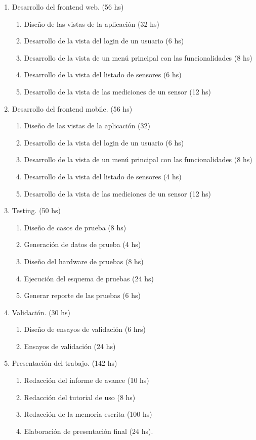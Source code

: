 \documentclass[
11pt, %
]{charter}
\begin{document}
\begin{enumerate}
\item Desarrollo del frontend web. (56 hs)
	\begin{enumerate}
	\item Diseño de las vistas de la aplicación (32 hs)
	\item Desarrollo de la vista del login de un usuario (6 hs)
	\item Desarrollo de la vista de un menú principal con las funcionalidades (8 hs)
	\item Desarrollo de la vista del listado de sensores (6 hs)
	\item Desarrollo de la vista de las mediciones de un sensor (12 hs)
	\end{enumerate}
\item Desarrollo del frontend mobile. (56 hs)
	\begin{enumerate}
	\item Diseño de las vistas de la aplicación (32)
	\item Desarrollo de la vista del login de un usuario (6 hs)
	\item Desarrollo de la vista de un menú principal con las funcionalidades (8 hs)
	\item Desarrollo de la vista del listado de sensores (4 hs)
	\item Desarrollo de la vista de las mediciones de un sensor (12 hs)
	\end{enumerate}
\item Testing. (50 hs)
	\begin{enumerate}
	\item Diseño de casos de prueba (8 hs)
	\item Generación de datos de prueba (4 hs)
	\item Diseño del hardware de pruebas (8 hs)
	\item Ejecución del esquema de pruebas (24 hs)
	\item Generar reporte de las pruebas (6 hs)
	\end{enumerate}
\item Validación. (30 hs)
	\begin{enumerate}
	\item Diseño de ensayos de validación (6 hrs)
	\item Ensayos de validación (24 hs)
	\end{enumerate}
\item Presentación del trabajo. (142 hs)
	\begin{enumerate}
	\item Redacción del informe de avance (10 hs)
	\item Redacción del tutorial de uso (8 hs)
	\item Redacción de la memoria escrita (100 hs)
	\item Elaboración de presentación final (24 hs).
	\end{enumerate}	
\end{enumerate}
\end{document}
